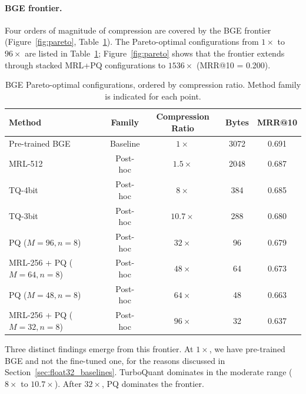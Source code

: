 \paragraph{BGE frontier.}
Four orders of magnitude of compression are covered by the BGE frontier
(Figure~\ref{fig:pareto}, Table~\ref{tab:pareto_bge}). The Pareto-optimal
configurations from $1\times$ to $96\times$ are listed in
Table~\ref{tab:pareto_bge}; Figure~\ref{fig:pareto} shows that the
frontier extends through stacked MRL+PQ configurations to $1536\times$
(MRR@10 = 0.200).

\begin{table}[H]
  \centering
  \caption[BGE Pareto-optimal configurations.]{BGE Pareto-optimal configurations, ordered by compression ratio. Method family is indicated for each point.}
  \label{tab:pareto_bge}
  \begin{tabular}{| l | c | c | c | c |}
    \hline
    \textbf{Method}                & \textbf{Family} & \textbf{Compression Ratio} & \textbf{Bytes} & \textbf{MRR@10} \\ [0.5ex] \hline
    Pre-trained BGE                & Baseline        & $1\times$                  & 3072           & 0.691           \\ \hline
    MRL-512                        & Post-hoc        & $1.5\times$                & 2048           & 0.687           \\ \hline
    TQ-4bit                        & Post-hoc        & $8\times$                  &  384           & 0.685           \\ \hline
    TQ-3bit                        & Post-hoc        & $10.7\times$               &  288           & 0.680           \\ \hline
    PQ ($M{=}96, n{=}8$)           & Post-hoc        & $32\times$                 &   96           & 0.679           \\ \hline
    MRL-256 + PQ ($M{=}64, n{=}8$) & Post-hoc        & $48\times$                 &   64           & 0.673           \\ \hline
    PQ ($M{=}48, n{=}8$)           & Post-hoc        & $64\times$                 &   48           & 0.663           \\ \hline
    MRL-256 + PQ ($M{=}32, n{=}8$) & Post-hoc        & $96\times$                 &   32           & 0.637           \\ \hline
  \end{tabular}
\end{table}

Three distinct findings emerge from this frontier. At $1\times$, we
have pre-trained BGE and not the fine-tuned one, for the reasons
discussed in Section~\ref{sec:float32_baselines}. TurboQuant dominates
in the moderate range ($8\times$ to $10.7\times$). After $32\times$, PQ
dominates the frontier.


